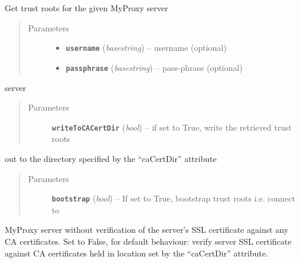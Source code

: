\documentclass[letterpaper,10pt,english]{sphinxmanual}
\begin{document}
\begin{fulllineitems}
\begin{fulllineitems}
\end{fulllineitems}


\begin{fulllineitems}
\label{client:myproxy.client.MyProxyClient.getTrustRoots}
Get trust roots for the given MyProxy server
\begin{quote}\begin{description}
\item[{Parameters}] \leavevmode\begin{itemize}
\item {} 
\textbf{\texttt{username}} (\emph{basestring}) -- username (optional)

\item {} 
\textbf{\texttt{passphrase}} (\emph{basestring}) -- pass-phrase (optional)

\end{itemize}

\end{description}\end{quote}

server
\begin{quote}\begin{description}
\item[{Parameters}] \leavevmode
\textbf{\texttt{writeToCACertDir}} (\emph{bool}) -- if set to True, write the retrieved trust roots

\end{description}\end{quote}

out to the directory specified by the ``caCertDir'' attribute
\begin{quote}\begin{description}
\item[{Parameters}] \leavevmode
\textbf{\texttt{bootstrap}} (\emph{bool}) -- If set to True, bootstrap trust roots i.e. connect to

\end{description}\end{quote}

MyProxy server without verification of the server's SSL certificate
against any CA certificates.  Set to False, for default behaviour:
verify server SSL certificate against CA certificates held in location
set by the ``caCertDir'' attribute.


\end{fulllineitems}
\end{fulllineitems}
\end{document}
